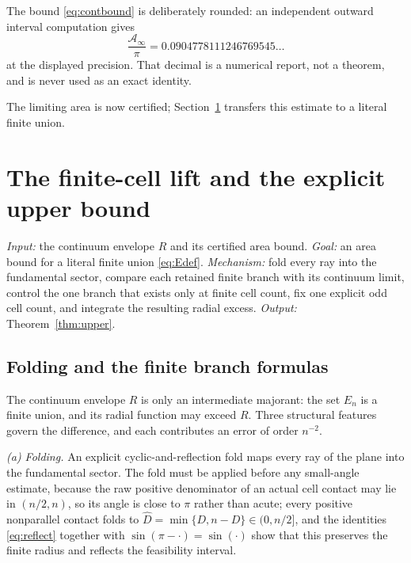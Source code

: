 \documentclass[11pt]{article}
\theoremstyle{plain}
\theoremstyle{definition}
\theoremstyle{remark}
\begin{document}
The bound \eqref{eq:contbound} is deliberately rounded: an independent outward
interval computation gives
\[
  \frac{\mathcal A_{\infty}}{\pi}=0.0904778111246769545\ldots
\]
at the displayed precision. That decimal is a numerical report, not a theorem,
and is never used as an exact identity.

The limiting area is now certified; Section~\ref{sec:finitelift} transfers this
estimate to a literal finite union.

\section{The finite-cell lift and the explicit upper bound}
\label{sec:finitelift}

\emph{Input:} the continuum envelope $R$ and its certified area bound.
\emph{Goal:} an area bound for a literal finite union \eqref{eq:Edef}.
\emph{Mechanism:} fold every ray into the fundamental sector, compare each
retained finite branch with its continuum limit, control the one branch that
exists only at finite cell count, fix one explicit odd cell count, and integrate
the resulting radial excess. \emph{Output:} Theorem~\ref{thm:upper}.

\subsection{Folding and the finite branch formulas}

The continuum envelope $R$ is only an intermediate majorant: the set $E_{n}$ is
a finite union, and its radial function may exceed $R$. Three structural
features govern the difference, and each contributes an error of order $n^{-2}$.

\emph{(a) Folding.} An explicit cyclic-and-reflection fold maps every ray of the
plane into the fundamental sector. The fold must be applied before any
small-angle estimate, because the raw positive denominator of an actual cell
contact may lie in $(n/2,n)$, so its angle is close to $\pi$ rather than acute;
every positive nonparallel contact folds to
$\widehat D=\min\{D,n-D\}\in(0,n/2]$, and the identities \eqref{eq:reflect}
together with $\sin(\pi-\cdot)=\sin(\cdot)$ show that this preserves the finite
radius and reflects the feasibility interval.
\end{document}
